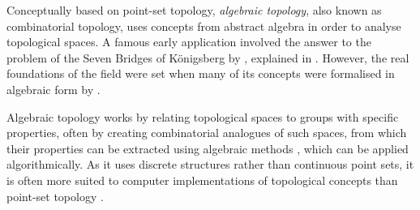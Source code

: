 Conceptually based on point-set topology, \emph{algebraic topology}, also known as combinatorial topology, uses concepts from abstract algebra in order to analyse topological spaces.
A famous early application involved the answer to the problem of the Seven Bridges of K\"onigsberg by \citet{Euler41}, explained in .
However, the real foundations of the field were set when many of its concepts were formalised in algebraic form by \citet{Poincare95}.

Algebraic topology works by relating topological spaces to groups with specific properties, often by creating combinatorial analogues of such spaces, from which their properties can be extracted using algebraic methods \citep{Henle94}, which can be applied algorithmically.
As it uses discrete structures rather than continuous point sets, it is often more suited to computer implementations of topological concepts than point-set topology \citep[\S{}3.3.5]{Worboys04}.

